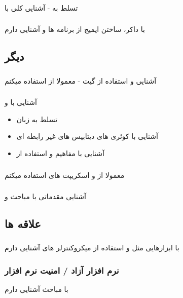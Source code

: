 \documentclass{article}
\begin{document}
\subsubsection{}
تسلط به   -  آشنایی کلی با 
\subsubsection{}
با داکر، ساختن ایمیج از برنامه ها و
 آشنایی دارم 
\subsection{دیگر}
\subsubsection{}
آشنایی و استفاده از گیت - معمولا از  استفاده میکنم
\subsubsection{}
آشنایی با  و 
\begin{itemize}
\item تسلط به زبان 
\item آشنایی با کوئری های دیتابیس های غیر رابطه ای
\item آشنایی با مفاهیم  و استفاده از 
\end{itemize}
\subsubsection{}
معمولا از  و اسکریپت های  استفاده میکنم
\subsubsection{}
آشنایی مقدماتی با مباحث  و 
\subsection{علاقه ها}
\subsubsection{}
با ابزارهایی مثل  و استفاده از میکروکنترلر های  آشنایی دارم
\subsubsection{نرم افزار آزاد / امنیت نرم افزار}
با مباحث  آشنایی دارم
\end{document}
